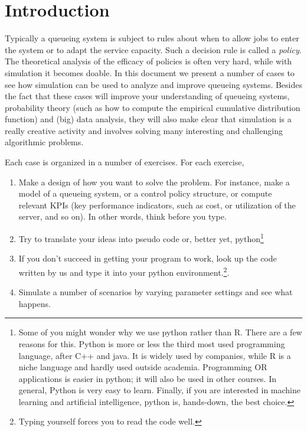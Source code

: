 \section*{Introduction}

Typically a queueing system is subject to rules about when to allow jobs to enter the system or to adapt the service capacity.
Such a decision rule is called a \emph{policy}.
The theoretical analysis of the efficacy of policies is often very hard, while with simulation it becomes doable.
In this document we present a number of cases to see how simulation can be used to analyze and improve queueing systems.
Besides the fact that these cases will improve your understanding of queueing systems, probability theory (such as how to compute the empirical cumulative distribution function) and (big) data analysis, they will also make clear that simulation is a really creative activity and involves solving many interesting and challenging algorithmic problems.


Each case is organized in a number of exercises.
For each exercise,
\begin{enumerate}
\item Make a design of how you want to solve the problem.
  For instance, make a model of a queueing system, or a control policy structure, or compute relevant KPIs (key performance indicators, such as cost, or utilization of the server, and so on).
  In other words, think before you type.
\item Try to translate your ideas into pseudo code or, better yet, python\footnote{Some of you might wonder why we use python rather than R.
    There are a few reasons for this.
    Python is more or less the third most used programming language, after C++ and java.
    It is widely used by companies, while R is a niche language and hardly used outside academia.
    Programming OR applications is easier in python; it will also be used in other courses.
    In general, Python is very easy to learn.
    Finally, if you are interested in machine learning and artificial intelligence, python is, hands-down, the best choice.}
  \item If you don't succeed in getting your program to work,  look up the code written by us and type it into your python environment.\footnote{Typing yourself forces you to read the code well.}.
  \item Simulate a number of scenarios by varying parameter settings and see what happens.
\end{enumerate}

